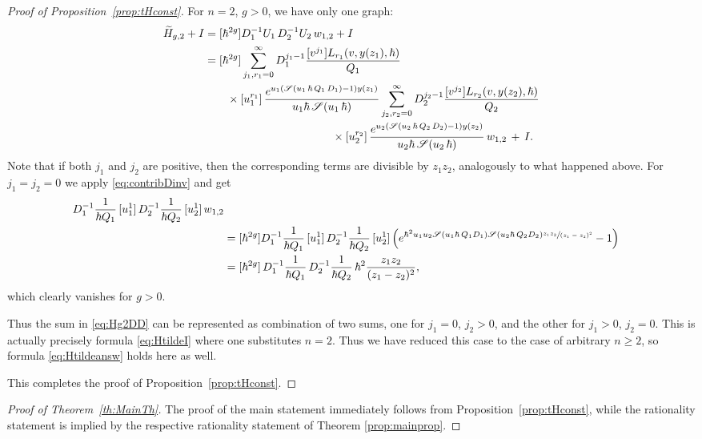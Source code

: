 \documentclass[JEP,XML,SOM,Unicode,NoEqCountersInSection,NoFloatCountersInSection]{cedram}
\let\mathcal\mathscr
\theoremstyle{plain}
\theoremstyle{definition}
\theoremstyle{remark}
\newcommand{\cS}{\mathcal{S}}
\begin{document}
\begin{proof}[Proof of Proposition~\ref{prop:tHconst}]
For $n=2$, $g>0$, we have only one graph:\vspace*{-3pt}
\begin{equation}\label{eq:Hg2DD}
\begin{aligned}
\widetilde{H}_{g,2}+I &=[\hbar^{2g}]D_1^{-1} U_1\, D_2^{-1} U_2\, w_{1,2} +I \\
&=[\hbar^{2g}]\sum_{j_1,r_1=0}^\infty D_1^{j_1-1}\frac{[v^{j_1}]L_{r_1}(v,y(z_1),\hbar)}{Q_1}\\
&\qquad\times[u_1^{r_1}]\, \frac{e^{u_1(\cS(u_1\,\hbar\,Q_1\,D_1)-1)y(z_1)}}{u_1\hbar\,\cS(u_1\,\hbar)}
\sum_{j_2,r_2=0}^\infty D_2^{j_2-1}\frac{[v^{j_2}]L_{r_2}(v,y(z_2),\hbar)}{Q_2}\\
&\hspace*{4cm}\times[u_2^{r_2}]\, \frac{e^{u_2(\cS(u_2\,\hbar\,Q_2\,D_2)-1)y(z_2)}}{u_2\hbar\,\cS(u_2\,\hbar)}\,w_{1,2}\,+\,I.
\end{aligned}
\end{equation}
Note that if both $j_1$ and $j_2$ are positive, then the corresponding terms are divisible by $z_1z_2$, analogously to what happened above. For $j_1=j_2=0$ we apply \eqref{eq:contribDinv} and get\vspace*{-3pt}
\begin{align*}
[\hbar&^{2g}]D_{1}^{-1}\frac{1}{\hbar Q_1}\,[u_1^1]\,D_{2}^{-1}\frac{1}{\hbar Q_2}\,[u_2^1]\, w_{1,2}\\ &= [\hbar^{2g}]D_{1}^{-1}\frac{1}{\hbar Q_1}\,[u_1^1]\,D_{2}^{-1}\frac{1}{\hbar Q_2}\,[u_2^1]\, \Bigl(e^{\hbar^2u_1u_2\cS(u_1\hbar\,Q_1 D_1)\cS(u_2\hbar\,Q_2 D_2) \sfrac{z_1 z_2}{(z_1-z_2)^2}}-1 \Bigr)\\
&= [\hbar^{2g}]\,D_{1}^{-1}\frac{1}{\hbar Q_1}\,D_{2}^{-1}\frac{1}{\hbar Q_2}\, \hbar^2\frac{z_1 z_2}{(z_1-z_2)^2},
\end{align*}
which clearly vanishes for $g>0$.

Thus the sum in \eqref{eq:Hg2DD} can be represented as combination of two sums, one for $j_1=0$, $j_2>0$, and the other for $j_1>0$, $j_2=0$. This is actually precisely formula \eqref{eq:HtildeI} where one substitutes $n=2$. Thus we have reduced this case to the case of arbitrary $n\geq2$, so formula \eqref{eq:Htildeansw} holds here as well.

This completes the proof of Proposition~\ref{prop:tHconst}.
\end{proof}
\begin{proof}[Proof of Theorem~\ref{th:MainTh}]
The proof of the main statement immediately follows from Proposition~\ref{prop:tHconst}, while the rationality statement is implied by the respective rationality statement of Theorem \ref{prop:mainprop}.
\end{proof}
\end{document}
